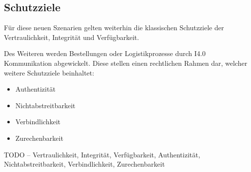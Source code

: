 \subsection{Schutzziele}
Für diese neuen Szenarien gelten weiterhin die klassischen Schutzziele der Vertraulichkeit, Integrität und Verfügbarkeit. 

Des Weiteren werden Bestellungen oder Logistikprozesse durch I4.0 Kommunikation abgewickelt. Diese stellen einen rechtlichen Rahmen dar, welcher weitere Schutzziele beinhaltet:
\begin{itemize}
    \item Authentizität
    \item Nichtabstreitbarkeit
    \item Verbindlichkeit
    \item Zurechenbarkeit
  \end{itemize}

TODO – Vertraulichkeit, Integrität, Verfügbarkeit, Authentizität, Nichtabstreitbarkeit, Verbindlichkeit, Zurechenbarkeit
